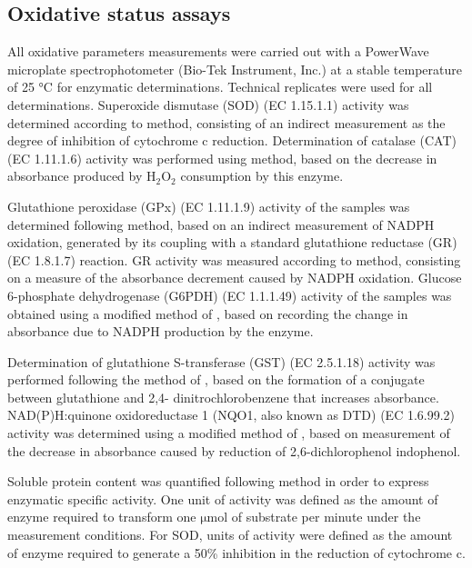 \documentclass[final,3p,times,authoryear]{elsarticle}
\begin{document}
\subsection{Oxidative status assays}
\label{subsec2}

All oxidative parameters measurements were carried out with a PowerWave microplate spectrophotometer (Bio-Tek Instrument, Inc.) at a stable temperature of 25 °C for enzymatic determinations. Technical replicates were used for all determinations. Superoxide dismutase (SOD) (EC 1.15.1.1) activity was determined according to \citet{McCord1969} method, consisting of an indirect measurement as the degree of inhibition of cytochrome c reduction. Determination of catalase (CAT) (EC 1.11.1.6) activity was performed using \citet{Aebi1984} method, based on the decrease in absorbance produced by $\mathrm{H_2O_2}$ consumption by this enzyme.

Glutathione peroxidase (GPx) (EC 1.11.1.9) activity of the samples was determined following \citet{Floh1984} method, based on an indirect measurement of NADPH oxidation, generated by its coupling with a standard glutathione reductase (GR) (EC 1.8.1.7) reaction. GR activity was measured according to \citet{Carlberg1975} method, consisting on a measure of the absorbance decrement caused by NADPH oxidation. Glucose 6-phosphate dehydrogenase (G6PDH) (EC 1.1.1.49) activity of the samples was obtained using a modified method of \citet{Lhr1965}, based on recording the change in absorbance due to NADPH production by the enzyme.

Determination of glutathione S-transferase (GST) (EC 2.5.1.18) activity was performed following the method of \citet{Frasco2002}, based on the formation of a conjugate between glutathione and 2,4- dinitrochlorobenzene that increases absorbance. NAD(P)H:quinone oxidoreductase 1 (NQO1, also known as DTD) (EC 1.6.99.2) activity was determined using a modified method of \citet{Lemaire1996}, based on measurement of the decrease in absorbance caused by reduction of 2,6-dichlorophenol indophenol.

Soluble protein content was quantified following \citet{Bradford1976} method in order to express enzymatic specific activity. One unit of activity was defined as the amount of enzyme required to transform one $\mathrm{\mu}$mol of substrate per minute under the measurement conditions. For SOD, units of activity were defined as the amount of enzyme required to generate a 50\% inhibition in the reduction of cytochrome c.
\end{document}
